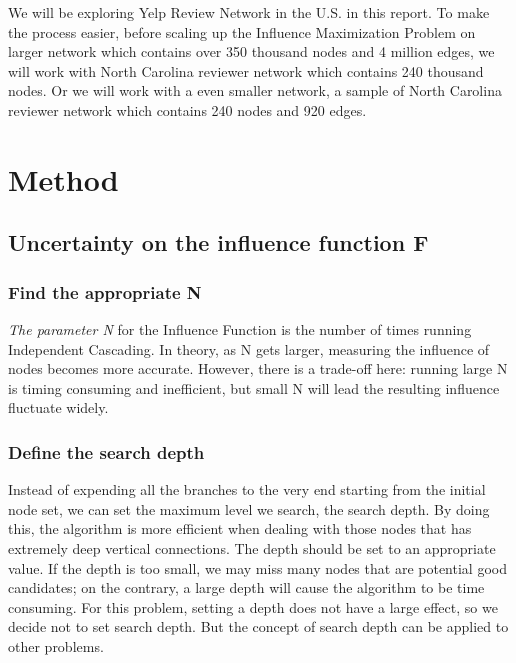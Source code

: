 \documentclass{article}
\begin{document}
\vspace{0.1in}

We will be exploring Yelp Review Network in the U.S. in this report. To make the process easier, before scaling up the Influence Maximization Problem on larger network which contains over 350 thousand nodes and 4 million edges, we will work with North Carolina reviewer network which contains 240 thousand nodes. Or we will work with a even smaller network, a sample of North Carolina reviewer network which contains 240 nodes and 920 edges.




\section{Method}


\subsection{Uncertainty on the influence function F}   %

\subsubsection{Find the appropriate N}   %
\emph{The parameter N} for the Influence Function is the number of times running Independent Cascading. In theory, as N gets larger, measuring the influence of nodes becomes more accurate. However, there is a trade-off here: running large N is timing consuming and inefficient, but small N will lead the resulting influence fluctuate widely. 

\subsubsection{Define the search depth}   %

Instead of expending all the branches to the very end starting from the initial node set, we can set the maximum level we search, the search depth. By doing this, the algorithm is more efficient when dealing with those nodes that has extremely deep vertical connections. The depth should be set to an appropriate value. If the depth is too small, we may miss many nodes that are potential good candidates; on the contrary, a large depth will cause the algorithm to be time consuming. For this problem, setting a depth does not have a large effect, so we decide not to set search depth. But the concept of search depth can be applied to other problems.
\end{document}
